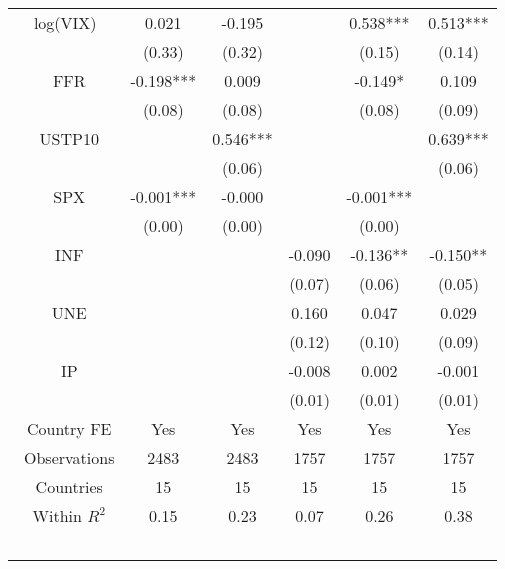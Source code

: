 \begin{tiny}\begin{tabular}{cccccc}
\toprule
log(VIX)& 0.021&-0.195&& 0.538***& 0.513***\\\
 &(0.33)&(0.32)&&(0.15)&(0.14)\\\
FFR&-0.198***& 0.009&&-0.149*& 0.109\\\
 &(0.08)&(0.08)&&(0.08)&(0.09)\\\
USTP10&& 0.546***&&& 0.639***\\\
 &&(0.06)&&&(0.06)\\\
SPX&-0.001***&-0.000&&-0.001***&\\\
 &(0.00)&(0.00)&&(0.00)&\\\
INF&&&-0.090&-0.136**&-0.150**\\\
 &&&(0.07)&(0.06)&(0.05)\\\
UNE&&& 0.160& 0.047& 0.029\\\
 &&&(0.12)&(0.10)&(0.09)\\\
IP&&&-0.008& 0.002&-0.001\\\
 &&&(0.01)&(0.01)&(0.01)\\\
Country FE&Yes&Yes&Yes&Yes&Yes\\\
Observations&2483&2483&1757&1757&1757\\\
Countries&15&15&15&15&15\\\
Within $R^2$&0.15&0.23&0.07&0.26&0.38\\\
\end{tabular}
\end{tiny}